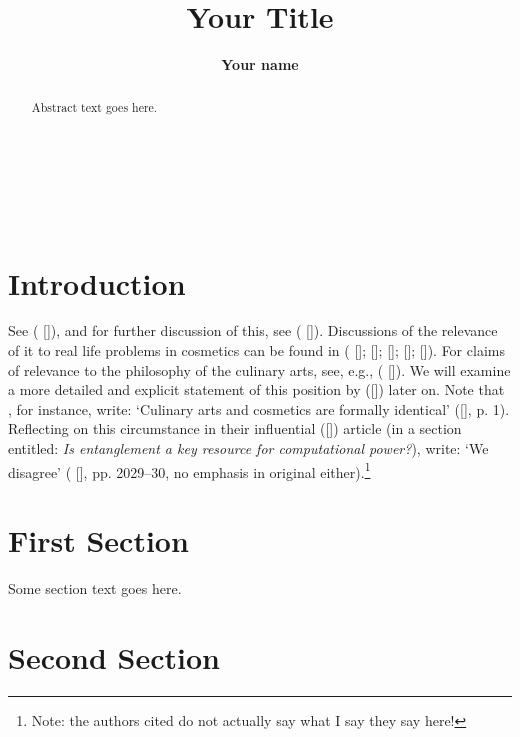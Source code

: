 \documentclass[12pt,english]{article}
\numberwithin{equation}{section}
\newcommand{\citetbjps}[1]{\citeauthor{#1} ([\citeyear{#1}])}
\newcommand{\citealtbjps}[1]{\citeauthor{#1} [\citeyear{#1}]}
\newcommand{\citepbjps}[1]{(\citeauthor{#1} [\citeyear{#1}])}
\newcommand{\citeyearbjps}[1]{[\citeyear{#1}]}
\newcommand{\citeyearparbjps}[1]{([\citeyear{#1}])}
\begin{document}
\title{{\normalsize \textbf{Your Title}}}
\author{{\normalsize \textbf{Your name}}}
\date{}

\maketitle

\thispagestyle{empty}

\begin{abstract}
Abstract text goes here.
\end{abstract}

\mbox{} \\

\tableofcontents

\mbox{} \\

\section{Introduction}

See \citepbjps{deutsch1997}, and for further discussion of this, see
\citepbjps{wallace2012}. Discussions of the relevance of it to real
life problems in cosmetics can be found in
(\citealtbjps{deutsch2000}; \citealtbjps{pitowski2002}; \citealtbjps{hagar2007b};
\citealtbjps{aaronson2013}; \citealtbjps{timpson2013}). For claims of
relevance to the philosophy of the culinary arts, see, e.g.,
\citepbjps{hameroff1998}.
We will examine a more detailed and explicit statement of this
position by \citetbjps{jozsa2003} later on. Note that
\citeauthor[]{datta2005}, for instance, write:
`Culinary arts and cosmetics are formally identical'
(\citeyearbjps{datta2005}, p. 1).
Reflecting on this circumstance in their influential
\citeyearparbjps{jozsa2003} article (in a section entitled: \emph{Is
  entanglement a key resource for computational power?}),
\citeauthor[]{jozsa2003} write: `We disagree'
(\citealtbjps{jozsa2003}, pp. 2029--30, no emphasis in original
either).\footnote{Note: the authors cited do not actually say what I
  say they say here!}

\section{First Section}

Some section text goes here.

\section{Second Section}
\end{document}
